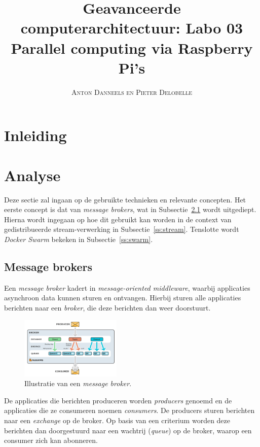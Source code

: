 \documentclass[twocolumn, a4paper]{article}
\begin{document}
\title{Geavanceerde computerarchitectuur: Labo 03 \\ 
\large{Parallel computing via Raspberry Pi's}}
\author{\textsc{Anton Danneels en Pieter Delobelle}}
\date{}
\maketitle

\section{Inleiding}

\section{Analyse}
Deze sectie zal ingaan op de gebruikte technieken en relevante concepten. Het eerste concept is dat van \emph{message brokers}, wat in Subsectie~\ref{ss:broker} wordt uitgediept. Hierna wordt ingegaan op hoe dit gebruikt kan worden in de context van gedistribueerde stream-verwerking in Subsectie~\ref{ss:stream}. Tenslotte wordt \emph{Docker Swarm} bekeken in Subsectie~\ref{ss:swarm}.

\subsection{Message brokers}\label{ss:broker}
Een \emph{message broker} kadert in \emph{message-oriented middleware}, waarbij applicaties asynchroon data kunnen sturen en ontvangen. Hierbij sturen alle applicaties berichten naar een \emph{broker}, die deze berichten dan weer doorstuurt.

\begin{figure}[htb]
    \centering
    \includegraphics[width=0.43\textwidth]{exchanges-topic-fanout-direct.png}
    \caption{Illustratie van een \emph{message broker}.}\label{fig:broker}
\end{figure}

De applicaties die berichten produceren worden \emph{producers} genoemd en de applicaties die ze consumeren noemen \emph{consumers}. De producers sturen berichten naar een \emph{exchange} op de broker. Op basis van een criterium worden deze berichten dan doorgestuurd naar een wachtrij (\emph{queue}) op de broker, waarop een consumer zich kan abonneren.
\end{document}
